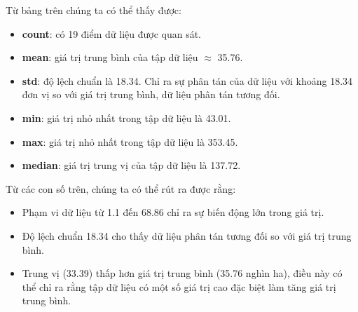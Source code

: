 \documentclass[a4paper,12pt]{report}
\begin{document}
\begin{flushleft}
	Từ bảng trên chúng ta có thể thấy được:
	\begin{itemize}
		\item \textbf{count}: có 19 điểm dữ liệu được quan sát.

		\item \textbf{mean}: giá trị trung bình của tập dữ liệu $\approx$ 35.76.

		\item \textbf{std}: độ lệch chuẩn là 18.34. Chỉ ra sự phân tán của dữ liệu với khoảng 18.34 đơn vị so với giá trị trung bình, dữ liệu phân tán tương đối.

		\item \textbf{min}: giá trị nhỏ nhất trong tập dữ liệu là 43.01.

		\item \textbf{max}: giá trị nhỏ nhất trong tập dữ liệu là 353.45.

		\item \textbf{median}: giá trị trung vị của tập dữ liệu là 137.72.
	\end{itemize}

	Từ các con số trên, chúng ta có thể rút ra được rằng:
	\begin{itemize}
		\item Phạm vi dữ liệu từ 1.1 đến 68.86 chỉ ra sự biến động lớn trong giá trị.

		\item Độ lệch chuẩn 18.34 cho thấy dữ liệu phân tán tương đối so với giá trị trung bình.

		\item Trung vị (33.39) thấp hơn giá trị trung bình (35.76 nghìn ha), điều này có thể chỉ ra rằng tập dữ liệu có một số giá trị cao đặc biệt làm tăng giá trị trung bình.
	\end{itemize}
\end{flushleft}
\end{document}
